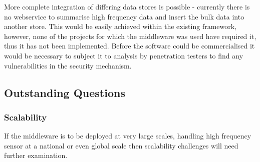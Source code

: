 More complete integration of differing data stores is possible - currently there is no webservice to summarise high frequency data and insert the bulk data into another store. This would be easily achieved within the existing framework, however, none of the projects for which the middleware was used have required it, thus it has not been implemented. Before the software could be commercialised it would be necessary to subject it to analysis by penetration testers to find any vulnerabilities in the security mechanism.

\subsection{Outstanding Questions}
\subsubsection{Scalability}
If the middleware is to be deployed at very large scales, handling high frequency sensor at a national or even global scale then scalability challenges will need further examination. 

